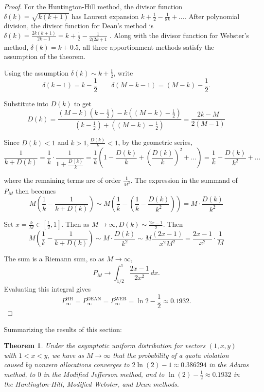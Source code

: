 \documentclass[11pt]{article}
\newtheorem{theorem}{Theorem}[section]
\theoremstyle{definition}
\theoremstyle{definition}
\begin{document}
\begin{proof}
For the Huntington-Hill method, the divisor function $\delta(k) = \sqrt{k(k+1)}$ has Laurent expansion $k + \frac12 -\frac{1}{8k}+\ldots$. After polynomial division, the divisor function for Dean's method is $\delta(k) = \frac{2k(k+1)}{2k+1}= k + \frac 12 - \frac{1}{2(2k+1}$ . Along with the divisor function for Webster's method, $\delta(k) = k +0.5$, all three apportionment methods satisfy the assumption of the theorem. 

Using the assumption $\delta(k) \sim k + \frac 12$, write
$$\delta(k-1)=k-\frac{1}{2} \qquad \delta(M-k-1)=(M-k)-\frac{1}{2}.$$

Substitute into $D(k)$ to get 
$$
D(k) =\frac{(M-k)(k-\frac{1}{2}) - k((M-k)-\frac{1}{2})}{(k-\frac{1}{2})+((M-k)-\frac{1}{2})} =\frac{2k-M}{2(M-1)}$$

Since $D(k)<1$ and $k>1, \frac{D(k)}{k}<1$, by the geometric series, 
$$
 \frac{1}{k+D(k)} = \frac1k \cdot \frac{1}{1 + \frac{D(k)}{k}} = \frac1k \left(1 -\frac{D(k)}{k} + \left(\frac{D(k)}{k}\right)^2+\ldots\right) = \frac1k - \frac{D(k)}{k^2} +\ldots
$$

where the remaining terms are of order $\frac{1}{M^3}$.
The expression in the summand of $P_M$ then becomes
$$ M\left(\frac{1}{k}-\frac{1}{k+D(k)}\right) \sim M\left(\frac{1}{k}-\left(\frac1k - \frac{D(k)}{k^2}\right)\right) = M\cdot \frac{D(k)}{k^2}$$

Set $x = \frac kM \in [\tfrac12,1]$. Then as $M \to \infty, D(k)\sim \frac{2x-1}{2}$. Then 
$$
M \left( \frac{1}{k} - \frac{1}{k + D(k)}\right) \sim M\cdot \frac{D(k)}{k^2} \sim M\frac{(2x-1)}{x^2M^2} = \frac{2x-1}{x^2}\cdot \frac 1M
$$

The sum is a Riemann sum, so as $M \to \infty,$
$$
P_M \to \int_{1/2}^{1} \frac{2x-1}{2x^2}\,dx.
$$
Evaluating this integral gives $$P_\infty^\text{HH} = P_\infty^\text{DEAN} = P_\infty^\text{WEB} = \ln2 - \frac12 \approx 0.1932. $$
\end{proof}
Summarizing the results of this section:
\begin{theorem}\label{Mtoinftyproblimit}
    Under the asymptotic uniform distribution for vectors $(1,x,y)$ with $1<x<y$, we have as $M \to \infty$ that the probability of a quota violation caused by nonzero allocations converges to $2 \ln(2) - 1 \approx 0.386294$ in the Adams method, to $0$ in the Modified Jefferson method, and to $\ln(2) - \frac{1}{2} \approx 0.1932$ in the Huntington-Hill, Modified Webster, and Dean methods.
\end{theorem}
\end{document}
